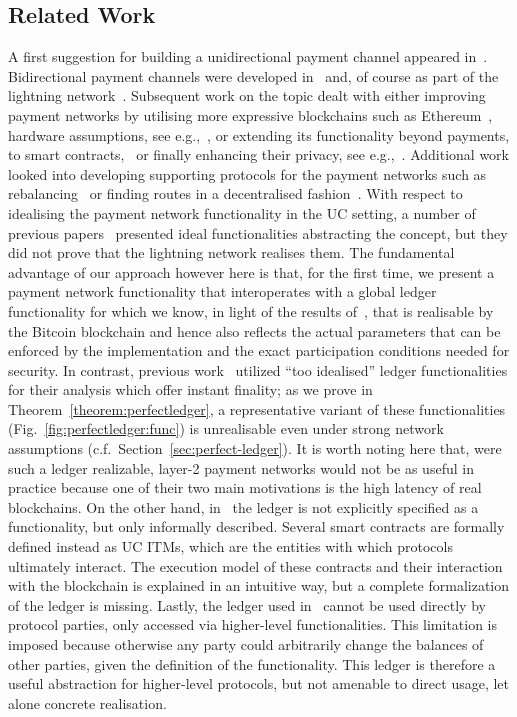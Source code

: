 \subsection{Related Work}
A first suggestion for building a
unidirectional payment channel appeared in~\cite{spilman}. Bidirectional payment
channels were developed in~\cite{DBLP:conf/sss/DeckerW15} and, of course as part
of the lightning network~\cite{lightning}. Subsequent work on the topic dealt
with either improving payment networks by utilising more expressive blockchains
such as Ethereum~\cite{perun}, hardware assumptions, see
e.g.,~\cite{DBLP:conf/systor/LindNEKPS18}, or extending its functionality beyond
payments, to smart contracts,~\cite{sprites} or finally enhancing their privacy,
see
e.g.,~\cite{Malavolta:2017:CPP:3133956.3134096,DBLP:conf/ccs/0001M17,DBLP:conf/ndss/HeilmanABSG17}.
Additional work looked into developing supporting protocols for the payment
networks such as rebalancing~\cite{DBLP:conf/ccs/KhalilG17} or finding routes in
a decentralised fashion~\cite{flare,spider}. With respect to idealising the
payment network functionality in the UC setting, a number of previous
papers~\cite{DBLP:conf/ccs/DziembowskiFH18,Malavolta:2017:CPP:3133956.3134096,sprites,perun}
presented ideal functionalities abstracting the concept, but they did
not prove that the lightning network realises them. The fundamental advantage of our
approach however here is that, for the first time, we present a payment network
functionality that interoperates with a global ledger functionality for which we
know, in light of the results of~\cite{BMTZ17}, that is realisable by the
Bitcoin blockchain and hence also reflects the actual parameters that can be
enforced by the implementation and the exact participation conditions needed for
security. In contrast, previous
work~\cite{DBLP:conf/ccs/DziembowskiFH18,Malavolta:2017:CPP:3133956.3134096,perun}
utilized ``too idealised'' ledger functionalities for their analysis which offer
instant finality; as we prove in Theorem~\ref{theorem:perfectledger}, a
representative variant of these functionalities
(Fig.~\ref{fig:perfectledger:func}) is unrealisable even under strong network
assumptions (c.f.\ Section~\ref{sec:perfect-ledger}). It is worth noting
here that, were such a ledger realizable, layer-2 payment networks would not be
as useful in practice because one of their two main motivations is the high
latency of real blockchains. On the other hand, in~\cite{sprites} the ledger is
not explicitly specified as a functionality, but only informally described.
Several smart contracts are formally defined instead as UC ITMs, which are the
entities with which protocols ultimately interact. The execution model of these
contracts and their interaction with the blockchain is explained in an intuitive
way, but a complete formalization of the ledger is missing. Lastly, the
ledger used in~\cite{DBLP:conf/ccs/DziembowskiFH18} cannot be used directly by
protocol parties, only accessed via higher-level functionalities. This
limitation is imposed because otherwise any party could arbitrarily change the
balances of other parties, given the definition of the functionality. This
ledger is therefore a useful abstraction for higher-level protocols, but not
amenable to direct usage, let alone concrete realisation.

